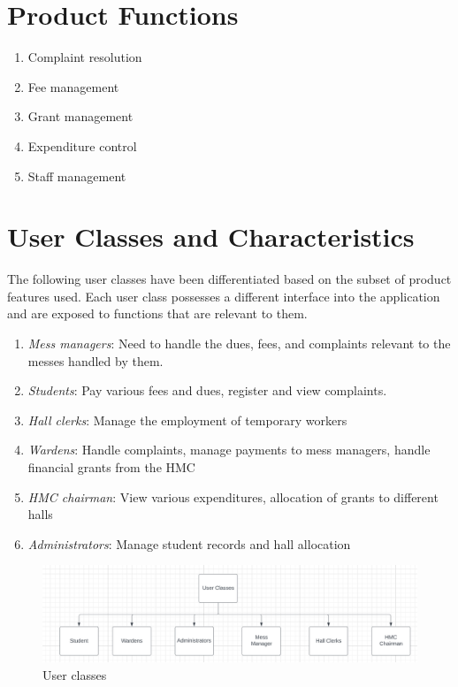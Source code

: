 \documentclass{scrreprt}
\begin{document}
\section{Product Functions}
\begin{enumerate}
    \item Complaint resolution
    \item Fee management
    \item Grant management
    \item Expenditure control
    \item Staff management
\end{enumerate}
\section{User Classes and Characteristics}
The following user classes have been differentiated based on the subset of product features used. Each user class possesses a different interface into the application and are exposed to functions that are relevant to them.
\begin{enumerate}
  \item \textit{Mess managers}: Need to handle the dues, fees, and complaints relevant to the messes handled by them.
  \item \textit{Students}: Pay various fees and dues, register and view complaints.
  \item \textit{Hall clerks}: Manage the employment of temporary workers
  \item \textit{Wardens}: Handle complaints, manage payments to mess managers, handle financial grants from the HMC
  \item \textit{HMC chairman}: View various expenditures, allocation of grants to different halls 
  \item \textit{Administrators}: Manage student records and hall allocation
\end{enumerate}
\begin{figure}
    \centering
    \includegraphics[scale=0.4]{classes.png}
    \caption{User classes}
    \label{fig:user_classes}
\end{figure}
\end{document}
